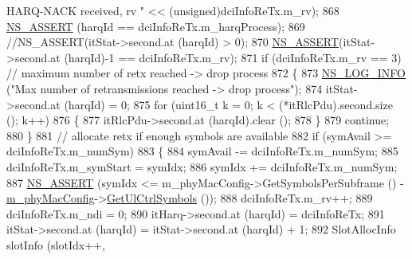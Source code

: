 \begin{DoxyCode}
{       HARQ-NACK received, rv " << (unsigned)dciInfoReTx.m\_rv);}
868                                 \hyperlink{assert_8h_a6dccdb0de9b252f60088ce281c49d052}{NS\_ASSERT} (harqId == dciInfoReTx.m\_harqProcess);
869                                 \textcolor{comment}{//NS\_ASSERT(itStat->second.at (harqId) > 0);}
870                                 \hyperlink{assert_8h_a6dccdb0de9b252f60088ce281c49d052}{NS\_ASSERT}(itStat->second.at (harqId)-1 == dciInfoReTx.m\_rv);
871                                 \textcolor{keywordflow}{if} (dciInfoReTx.m\_rv == 3) \textcolor{comment}{// maximum number of retx reached -> drop
       process}
872                                 \{
873                                         \hyperlink{group__logging_gafbd73ee2cf9f26b319f49086d8e860fb}{NS\_LOG\_INFO} (\textcolor{stringliteral}{"Max number of retransmissions reached ->
       drop process"});
874                                         itStat->second.at (harqId) = 0;
875                                         \textcolor{keywordflow}{for} (uint16\_t k = 0; k < (*itRlcPdu).second.size (); k++)
876                                         \{
877                                                 itRlcPdu->second.at (harqId).clear ();
878                                         \}
879                                         \textcolor{keywordflow}{continue};
880                                 \}
881                                 \textcolor{comment}{// allocate retx if enough symbols are available}
882                                 \textcolor{keywordflow}{if} (symAvail >= dciInfoReTx.m\_numSym)
883                                 \{
884                                         symAvail -= dciInfoReTx.m\_numSym;
885                                         dciInfoReTx.m\_symStart = symIdx;
886                                         symIdx += dciInfoReTx.m\_numSym;
887                                         \hyperlink{assert_8h_a6dccdb0de9b252f60088ce281c49d052}{NS\_ASSERT} (symIdx <= m\_phyMacConfig->GetSymbolsPerSubframe
       () - \hyperlink{classns3_1_1MmWaveMacScheduler_a24d7af4971d2e500fe543cefbafa2fd9}{m\_phyMacConfig}->\hyperlink{classns3_1_1MmWavePhyMacCommon_aa0bf8af14050bc5dc6513fbc86319a9b}{GetUlCtrlSymbols} ());
888                                         dciInfoReTx.m\_rv++;
889                                         dciInfoReTx.m\_ndi = 0;
890                                         itHarq->second.at (harqId) = dciInfoReTx;
891                                         itStat->second.at (harqId) = itStat->second.at (harqId) + 1;
892                                         SlotAllocInfo slotInfo (slotIdx++, 

\end{DoxyCode}
